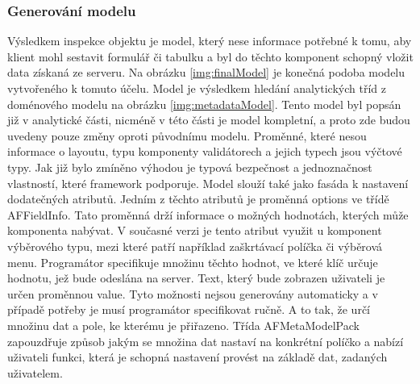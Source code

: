 \subsubsection{Generování modelu}
Výsledkem inspekce objektu je model, který nese informace potřebné k tomu, aby klient mohl sestavit formulář či tabulku a byl do těchto komponent schopný vložit data získaná ze serveru. Na obrázku \ref{img:finalModel} je konečná podoba modelu vytvořeného k tomuto účelu. Model je výsledkem hledání analytických tříd z doménového modelu na obrázku \ref{img:metadataModel}. Tento model byl popsán již v analytické části, nicméně v této části je model kompletní, a proto zde budou uvedeny pouze změny oproti původnímu modelu. Proměnné, které nesou informace o layoutu, typu komponenty validátorech a jejich typech jsou výčtové typy. Jak již bylo zmíněno výhodou je typová bezpečnost a jednoznačnost vlastností, které framework podporuje. Model slouží také jako fasáda k nastavení dodatečných atributů. Jedním z těchto atributů je proměnná options ve třídě AFFieldInfo. Tato proměnná drží informace o možných hodnotách, kterých může komponenta nabývat. V současné verzi je tento atribut využit u komponent výběrového typu, mezi které patří například zaškrtávací políčka či výběrová menu. Programátor specifikuje množinu těchto hodnot, ve které klíč určuje hodnotu, jež bude odeslána na server. Text, který bude zobrazen uživateli je určen proměnnou value. Tyto možnosti nejsou generovány automaticky a v případě potřeby je musí programátor specifikovat ručně. A to tak, že určí množinu dat a pole, ke kterému je přiřazeno. Třída AFMetaModelPack zapouzdřuje způsob jakým se množina dat nastaví na konkrétní políčko a nabízí uživateli funkci, která je schopná nastavení provést na základě dat, zadaných uživatelem.

